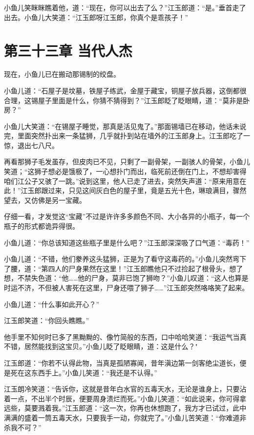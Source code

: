 \documentclass[12pt,oneside]{book}
\begin{document}
小鱼儿笑眯眯瞧着他，道：``现在，你可以出去了么？''江玉郎道：``是。''垂首走了出去。小鱼儿大笑道：``江玉郎呀江玉郎，你真个是乖孩子！''

\hypertarget{ux7b2cux4e09ux5341ux4e09ux7ae0-ux5f53ux4ee3ux4ebaux6770}{%
\chapter{第三十三章
当代人杰}\label{ux7b2cux4e09ux5341ux4e09ux7ae0-ux5f53ux4ee3ux4ebaux6770}}

现在，小鱼儿已在搬动那锡制的绞盘。

小鱼儿道：``石屋子是坟墓，铁屋子练武，金屋于藏宝，铜屋子放兵器，这倒都很合理，这锡屋子里面是什么，你猜不猜得到？''江玉郎眨了眨眼睛，道：``莫非是卧房？''

小鱼儿大笑道：``在锡屋子睡觉，那真是活见鬼了。''那面锡墙已在移动，他话未说完，里面突然扑出来一条猛狮，几乎就扑到站在墙外的江玉郎身上。江玉郎吃了一惊，退出七八尺。

再看那狮子毛发虽存，但皮肉已不见，只剩了一副骨架，一副骇人的骨架，小鱼儿笑道；``这狮子想必是饿极了，一心想扑门而出，临死前还倒在门上，不想却害得咱们江公子又骇了一跳。''说到这里，他人已走了进去，突然失声道：``原来用意在此！''江玉郎跟过来，只见这间灰白色的屋子里，竟是五光十色，琳琅满目，骤然望去，又仿佛是另一宝藏。

仔细一看，才发觉这``宝藏''不过是许许多多颜色不同、大小各异的小瓶子，每一个瓶子的形式都诡异得很。

小鱼儿道：``你总该知道这些瓶子里是什么吧？''江玉郎深深吸了口气道：``毒药！''

小鱼儿道：``不错，他们豢养这头猛狮，正是为了看守这毒药的。''小鱼儿突然弯下了腰，道：``第四人的尸身果然在这里！''江玉郎瞧他只不过捡起了根骨头，想了想，不禁失色道：``他\ldots\ldots 他的尸身，莫非已饱了狮吻？''小鱼儿叹道：``这人也算是时运不济，不但被人害死在这里，尸身还喂了狮子\ldots\ldots{}''江玉郎突然咯咯笑了起来。

小鱼儿道：``什么事如此开心？''

江玉郎笑道：``你回头瞧瞧。''

他手里不知何时已多了黑黝黝的、像竹简般的东西，口中哈哈笑道：``我运气当真不错，居然能找到这宝贝。''小鱼儿眨了眨眼睛，道：这是什么？"

江玉郎道：``你若不认得此物，当真是孤陋寡闻，昔年滇边第一剑客绝尘道长，便是死在这东西手上。''小鱼儿笑道：``我还是不认得。''

江玉朗冷笑道：``告诉你，这就是昔年白水官的五毒天水，无论是谁身上，只要沾着一点，不出半个时辰，便要周身溃烂而死。''小鱼儿笑道：``如此说来，你可得拿远些，莫要溅着我。''江玉郎道：``这一次，你再也休想跑了，我方才已试过，此中满满的盛着一筒五毒天水，只要我手一动，你就完了。''小鱼儿苦笑道：``你难道非杀我不可？''
\end{document}
